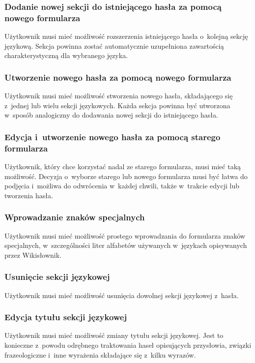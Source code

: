 \subsubsection{Dodanie nowej sekcji do istniejącego hasła za pomocą nowego formularza}
Użytkownik musi mieć możliwość rozszerzenia istniejącego hasła o~kolejną sekcję językową. Sekcja powinna zostać automatycznie uzupełniona zawartością charakterystyczną dla wybranego języka.

\subsubsection{Utworzenie nowego hasła za pomocą nowego formularza}
Użytkownik musi mieć możliwość stworzenia nowego hasła, składającego się z~jednej lub wielu sekcji językowych. Każda sekcja powinna być utworzona w~sposób analogiczny do dodawania nowej sekcji do istniejącego hasła.

\subsubsection{Edycja i~utworzenie nowego hasła za pomocą starego formularza}
Użytkownik, który chce korzystać nadal ze starego formularza, musi mieć taką możliwość. Decyzja o~wyborze starego lub nowego formularza musi być łatwa do podjęcia i~możliwa do odwrócenia w~każdej chwili, także w~trakcie edycji lub tworzenia hasła.

\subsubsection{Wprowadzanie znaków specjalnych}
Użytkownik musi mieć możliwość prostego wprowadzania do formularza znaków specjalnych, w~szczególności liter alfabetów używanych w~językach opisywanych przez Wikisłownik.

\subsubsection{Usunięcie sekcji językowej}
Użytkownik musi mieć możliwość usunięcia dowolnej sekcji językowej z~hasła.

\subsubsection{Edycja tytułu sekcji językowej}
Użytkownik musi mieć możliwość zmiany tytułu sekcji językowej. Jest to konieczne z~powodu odrębnego traktowania haseł opisujących przysłowia, związki frazeologiczne i~inne wyrażenia składające się z~kilku wyrazów.

